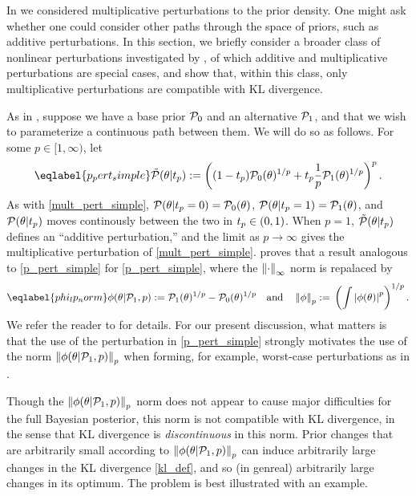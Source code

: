 In  we considered multiplicative perturbations to
the prior density.  One might ask whether one could consider other paths through
the space of priors, such as additive perturbations.  In this section, we
briefly consider a broader class of nonlinear perturbations investigated by
\citet{gustafson:1996:local}, of which additive and multiplicative perturbations
are special cases, and show that, within this class, only multiplicative
perturbations are compatible with KL divergence.

As in , suppose we have a base prior $\mathcal{P}_{0}$ and
an alternative $\mathcal{P}_{1}$, and that we wish to parameterize a continuous path
between them.  We will do so as follows. For some $p \in [1, \infty)$, let
%
\begin{align}\eqlabel{p_pert_simple}
%
\ptil(\theta \vert \tp) :=
    \left((1 - \tp)\pbase(\theta)^{1/p} +
    \tp \frac{1}{p}\palt(\theta)^{1/p} \right)^{p}.
%
\end{align}
%
As with \eqref{mult_pert_simple}, $\mathcal{P}(\theta \vert t_{p} = 0) = \mathcal{P}_{0}(\theta)$,
$\mathcal{P}(\theta \vert t_{p} = 1) = \mathcal{P}_{1}(\theta)$, and $\mathcal{P}(\theta \vert t_{p})$ moves
continously between the two in $t_{p} \in (0, 1)$.  When $p = 1$,
$\tilde{\mathcal{P}}(\theta \vert t_{p})$ defines an ``additive perturbation,'' and
the limit as $p \rightarrow \infty$ gives the multiplicative perturbation
of \eqref{mult_pert_simple}.
%
\citet{gustafson:1996:local} proves that a result analogous to
\eqref{p_pert_simple} for \eqref{p_pert_simple}, where the
$\left\Vert\cdot\right\Vert_{\infty}$ norm is repalaced by
%
\begin{align}\eqlabel{phi_lp_norm}
%
\phi(\theta \vert \palt, p) :={}
    \palt(\theta)^{1/p} - \pbase(\theta)^{1/p} \mathand
\norm{\phi}_p :={} \left(\int \abs{\phi(\theta)}^p \right)^{1/p}.
%
\end{align}
%
We refer the reader to \citet{gustafson:1996:local} for details.  For our
present discussion, what matters is that the use of the perturbation in
\eqref{p_pert_simple} strongly motivates the use of the norm $\left\Vert\phi(\theta
\vert \mathcal{P}_{1}, p)\right\Vert_p$ when forming, for example, worst-case perturbations as in
.

Though the $\left\Vert\phi(\theta \vert \mathcal{P}_{1}, p)\right\Vert_p$ norm does not appear to cause
major difficulties for the full Bayesian posterior, this norm is not compatible
with KL divergence, in the sense that KL divergence is {\em discontinuous} in
this norm.  Prior changes that are arbitrarily small according to
$\left\Vert\phi(\theta \vert \mathcal{P}_{1}, p)\right\Vert_p$ can induce arbitrarily large changes in
the KL divergence \eqref{kl_def}, and so (in genreal) arbitrarily large
changes in its optimum.  The problem is best illustrated with an
example.


